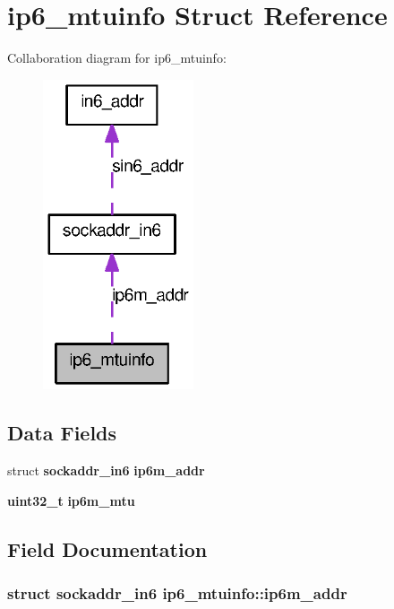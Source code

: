 \section{ip6\_\-mtuinfo Struct Reference}
\label{structip6__mtuinfo}


Collaboration diagram for ip6\_\-mtuinfo:
\nopagebreak
\begin{figure}[H]
\begin{center}
\leavevmode
\includegraphics[width=126pt]{structip6__mtuinfo__coll__graph}
\end{center}
\end{figure}
\subsection*{Data Fields}
\begin{DoxyCompactItemize}
\item 
struct {\bf sockaddr\_\-in6} {\bf ip6m\_\-addr}
\item 
{\bf uint32\_\-t} {\bf ip6m\_\-mtu}
\end{DoxyCompactItemize}


\subsection{Field Documentation}
\subsubsection[{ip6m\_\-addr}]{\setlength{\rightskip}{0pt plus 5cm}struct {\bf sockaddr\_\-in6} {\bf ip6\_\-mtuinfo::ip6m\_\-addr}}\label{structip6__mtuinfo_aac29838540885d08d66cc50bc97b528c}
